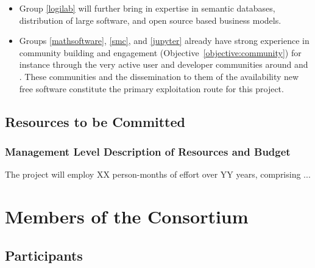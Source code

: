 \documentclass[noworkareas,deliverables,keys]{euproposal}                  %
\begin{document}
\begin{proposal}
\begin{itemize}
\item Group \ref{logilab} will further bring in expertise in semantic databases,
  distribution of large software, and open source based business models.

\item Groups \ref{mathsoftware}, \ref{smc}, and \ref{jupyter} already have strong
  experience in community building and engagement (Objective~\ref{objective:community})
  for instance through the very active user and developer communities around \GAP and
  \Sage. These communities and the dissemination to them of the availability new free
  software constitute the primary exploitation route for this project.
\end{itemize}



\draftpage

\subsection{Resources to be Committed}



\subsubsection*{Management Level Description of Resources and Budget}


The project will employ XX person-months of effort over YY years,
comprising ...



\newpage


\section{Members of the Consortium}

\subsection{Participants}


\end{proposal}
\end{document}

